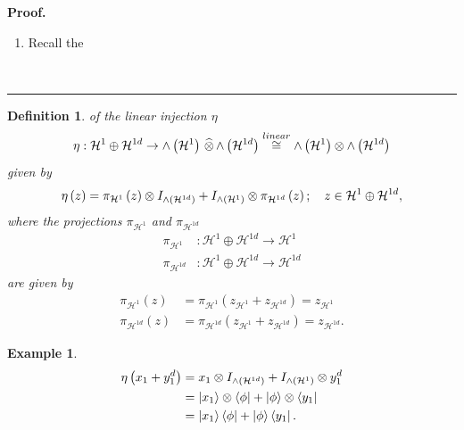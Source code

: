 \documentclass[aps,preprint]{revtex4}%
\newtheorem{definition}[theorem]{Definition}
\newtheorem{example}[theorem]{Example}
\newenvironment{proof}[1][Proof]{\noindent\textbf{#1.} }{\ \rule{0.5em}{0.5em}}
\begin{document}
\begin{proof}
\begin{enumerate}
\item Recall the
\end{enumerate}
\end{proof}

\begin{definition}
of the linear injection $\eta$
\begin{equation}
\eta:\mathcal{H}^{1}\oplus\mathcal{H}^{1d}\rightarrow{\huge \wedge}\left(
\mathcal{H}^{1}\right)  \,\widehat{\otimes}\,{\huge \wedge}\left(
\mathcal{H}^{1d}\right)  \overset{linear}{\cong}{\huge \wedge}\left(
\mathcal{H}^{1}\right)  \otimes{\huge \wedge}\left(  \mathcal{H}^{1d}\right)
\end{equation}
given by
\begin{equation}
\eta\left(  z\right)  =\pi_{\mathcal{H}^{1}}\left(  z\right)  \otimes
I_{{\huge \wedge}\left(  \mathcal{H}^{1d}\right)  }+I_{{\huge \wedge}\left(
\mathcal{H}^{1}\right)  }\otimes\pi_{\mathcal{H}^{1d}}\left(  z\right)  ;\quad
z\in\mathcal{H}^{1}\oplus\mathcal{H}^{1d},
\end{equation}
where the projections $\pi_{\mathcal{H}^{1}}$ and $\pi_{\mathcal{H}^{1d}}$
\begin{align}
\pi_{\mathcal{H}^{1}}  &  :\mathcal{H}^{1}\oplus\mathcal{H}^{1d}%
\rightarrow\mathcal{H}^{1}\\
\pi_{\mathcal{H}^{1d}}  &  :\mathcal{H}^{1}\oplus\mathcal{H}^{1d}%
\rightarrow\mathcal{H}^{1d}%
\end{align}
are given by
\begin{align}
\pi_{\mathcal{H}^{1}}\left(  z\right)   &  =\pi_{\mathcal{H}^{1}}\left(
z_{\mathcal{H}^{1}}+z_{\mathcal{H}^{1d}}\right)  =z_{\mathcal{H}^{1}}\\
\pi_{\mathcal{H}^{1d}}\left(  z\right)   &  =\pi_{\mathcal{H}^{1d}}\left(
z_{\mathcal{H}^{1}}+z_{\mathcal{H}^{1d}}\right)  =z_{\mathcal{H}^{1d}}.
\end{align}

\end{definition}

\begin{example}%
\begin{align}
\eta\left(  x_{1}+y_{1}^{d}\right)   &  =x_{1}\otimes I_{{\huge \wedge}\left(
\mathcal{H}^{1d}\right)  }+I_{{\huge \wedge}\left(  \mathcal{H}^{1}\right)
}\otimes y_{1}^{d}\\
&  =\left\vert x_{1}\right\rangle \otimes\left\langle \phi\right\vert
+\left\vert \phi\right\rangle \otimes\left\langle y_{1}\right\vert \\
&  =\left\vert x_{1}\right\rangle \left\langle \phi\right\vert +\left\vert
\phi\right\rangle \left\langle y_{1}\right\vert .
\end{align}

\end{example}
\end{document}
